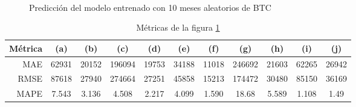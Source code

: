 \documentclass[a4paper,10pt]{article}
\begin{document}
\begin{figure}[H]
    \\
  \caption{Predicción del modelo entrenado con 10 meses aleatorios de BTC}
  \label{f:btc_mth_prophet}
\end{figure}

\begin{table}[t]
 \begin{center}
 \resizebox{12cm}{!} {
  \begin{tabular}{|r|c|c|c|c|c|c|c|c|c|c|}
    Métrica & (a) & (b) & (c) & (d) & (e) & (f) & (g) & (h) & (i) & (j) \\ \hline
    MAE & 62931 & 20152 & 196094 & 19753 & 34188 & 11018 & 246692 & 21603 & 62265 & 26942 \\
    RMSE & 87618 & 27940 & 274664 & 27251 & 45858 & 15213 & 174472 & 30480 & 85150 & 36169 \\
    MAPE & 7.543 & 3.136 & 4.508 & 2.217 & 4.099 & 1.590 & 18.68 & 5.589 & 1.108 & 1.49 \\ \hline
  \end{tabular}
  }
  \caption{Métricas de la figura \ref{f:btc_mth_prophet}}
  \label{tab:btc_prophet_m}
 \end{center}
\end{table}
\end{document}
